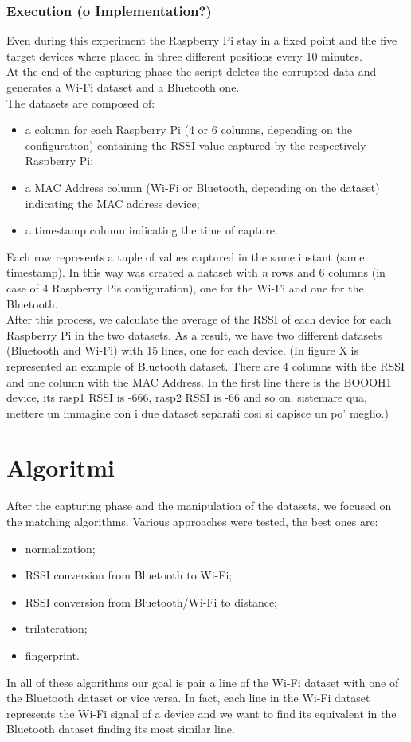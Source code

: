 \subsubsection{Execution (o Implementation?)}
Even during this experiment the Raspberry Pi stay in a fixed point and the five target devices where placed in three different positions every 10 minutes. \\
At the end of the capturing phase the script deletes the corrupted data and generates a Wi-Fi dataset and a Bluetooth one.\\
The datasets are composed of:
\begin{itemize}
\item a column for each Raspberry Pi (4 or 6 columns, depending on the configuration) containing the RSSI value captured by the respectively Raspberry Pi;
\item a MAC Address column (Wi-Fi or Bluetooth, depending on the dataset) indicating the MAC address device;
\item a timestamp column indicating the time of capture.
\end{itemize}
Each row represents a tuple of values captured in the same instant (same timestamp).
In this way was created a dataset with \textit{n} rows and 6 columns (in case of 4 Raspberry Pis configuration), one for the Wi-Fi and one for the Bluetooth.\\
\linebreak
After this process, we calculate the average of the RSSI of each device for each Raspberry Pi in the two datasets. As a result, we have two different datasets (Bluetooth and Wi-Fi) with 15 lines, one for each device. (In figure X is represented an example of Bluetooth dataset. There are 4 columns with the RSSI and one column with the MAC Address. In the first line there is the BOOOH1 device, its rasp1 RSSI is -666, rasp2 RSSI is -66 and so on. sistemare qua, mettere un immagine con i due dataset separati cosi si capisce un po' meglio.)

\section{Algoritmi}
After the capturing phase and the manipulation of the datasets, we focused on the matching algorithms. Various approaches were tested, the best ones are:
\begin{itemize}
\item normalization;
\item RSSI conversion from Bluetooth to Wi-Fi;
\item RSSI conversion from Bluetooth/Wi-Fi to distance;
\item trilateration;
\item fingerprint.
\end{itemize}
In all of these algorithms our goal is pair a line of the Wi-Fi dataset with one of the Bluetooth dataset or vice versa. In fact, each line in the Wi-Fi dataset represents the Wi-Fi signal of a device and we want to find its equivalent in the Bluetooth dataset finding its most similar line.

